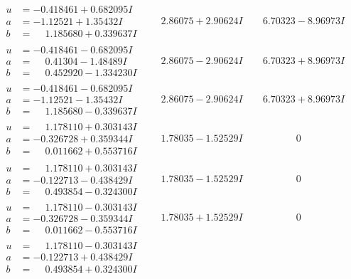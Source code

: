\documentclass[1p]{elsarticle_modified}
\theoremstyle{definition}
\begin{document}
$$\begin{array}{c|c|c}
\begin{aligned}
u &= -0.418461 + 0.682095 I \\
a &= -1.12521 + 1.35432 I \\
b &= \phantom{-}1.185680 + 0.339637 I\end{aligned}
 & \phantom{-}2.86075 + 2.90624 I & \phantom{-}6.70323 - 8.96973 I \\ \hline\begin{aligned}
u &= -0.418461 - 0.682095 I \\
a &= \phantom{-}0.41304 - 1.48489 I \\
b &= \phantom{-}0.452920 - 1.334230 I\end{aligned}
 & \phantom{-}2.86075 - 2.90624 I & \phantom{-}6.70323 + 8.96973 I \\ \hline\begin{aligned}
u &= -0.418461 - 0.682095 I \\
a &= -1.12521 - 1.35432 I \\
b &= \phantom{-}1.185680 - 0.339637 I\end{aligned}
 & \phantom{-}2.86075 - 2.90624 I & \phantom{-}6.70323 + 8.96973 I \\ \hline\begin{aligned}
u &= \phantom{-}1.178110 + 0.303143 I \\
a &= -0.326728 + 0.359344 I \\
b &= \phantom{-}0.011662 + 0.553716 I\end{aligned}
 & \phantom{-}1.78035 - 1.52529 I & \phantom{-0.000000 } 0 \\ \hline\begin{aligned}
u &= \phantom{-}1.178110 + 0.303143 I \\
a &= -0.122713 - 0.438429 I \\
b &= \phantom{-}0.493854 - 0.324300 I\end{aligned}
 & \phantom{-}1.78035 - 1.52529 I & \phantom{-0.000000 } 0 \\ \hline\begin{aligned}
u &= \phantom{-}1.178110 - 0.303143 I \\
a &= -0.326728 - 0.359344 I \\
b &= \phantom{-}0.011662 - 0.553716 I\end{aligned}
 & \phantom{-}1.78035 + 1.52529 I & \phantom{-0.000000 } 0 \\ \hline\begin{aligned}
u &= \phantom{-}1.178110 - 0.303143 I \\
a &= -0.122713 + 0.438429 I \\
b &= \phantom{-}0.493854 + 0.324300 I\end{aligned}

\end{array}$$
\end{document}
